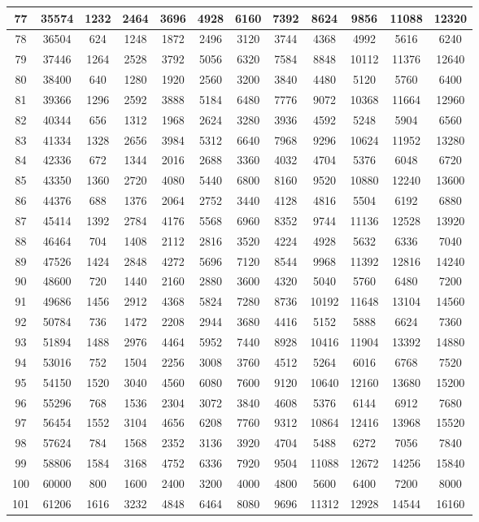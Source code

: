 \begin{center}
\begin{longtable}{|c|c|c|c|c|c|c|c|c|c|c|c|}
\hline
77 & 35574 & 1232 & 2464 & 3696 & 4928 & 6160 & 7392 & 8624 & 9856 & 11088 & 12320\tabularnewline
\hline
78 & 36504 & 624 & 1248 & 1872 & 2496 & 3120 & 3744 & 4368 & 4992 & 5616 & 6240\tabularnewline
\hline
79 & 37446 & 1264 & 2528 & 3792 & 5056 & 6320 & 7584 & 8848 & 10112 & 11376 & 12640\tabularnewline
\hline
80 & 38400 & 640 & 1280 & 1920 & 2560 & 3200 & 3840 & 4480 & 5120 & 5760 & 6400\tabularnewline
\hline
81 & 39366 & 1296 & 2592 & 3888 & 5184 & 6480 & 7776 & 9072 & 10368 & 11664 & 12960\tabularnewline
\hline
82 & 40344 & 656 & 1312 & 1968 & 2624 & 3280 & 3936 & 4592 & 5248 & 5904 & 6560\tabularnewline
\hline
83 & 41334 & 1328 & 2656 & 3984 & 5312 & 6640 & 7968 & 9296 & 10624 & 11952 & 13280\tabularnewline
\hline
84 & 42336 & 672 & 1344 & 2016 & 2688 & 3360 & 4032 & 4704 & 5376 & 6048 & 6720\tabularnewline
\hline
85 & 43350 & 1360 & 2720 & 4080 & 5440 & 6800 & 8160 & 9520 & 10880 & 12240 & 13600\tabularnewline
\hline
86 & 44376 & 688 & 1376 & 2064 & 2752 & 3440 & 4128 & 4816 & 5504 & 6192 & 6880\tabularnewline
\hline
87 & 45414 & 1392 & 2784 & 4176 & 5568 & 6960 & 8352 & 9744 & 11136 & 12528 & 13920\tabularnewline
\hline
88 & 46464 & 704 & 1408 & 2112 & 2816 & 3520 & 4224 & 4928 & 5632 & 6336 & 7040\tabularnewline
\hline
89 & 47526 & 1424 & 2848 & 4272 & 5696 & 7120 & 8544 & 9968 & 11392 & 12816 & 14240\tabularnewline
\hline
90 & 48600 & 720 & 1440 & 2160 & 2880 & 3600 & 4320 & 5040 & 5760 & 6480 & 7200\tabularnewline
\hline
91 & 49686 & 1456 & 2912 & 4368 & 5824 & 7280 & 8736 & 10192 & 11648 & 13104 & 14560\tabularnewline
\hline
92 & 50784 & 736 & 1472 & 2208 & 2944 & 3680 & 4416 & 5152 & 5888 & 6624 & 7360\tabularnewline
\hline
93 & 51894 & 1488 & 2976 & 4464 & 5952 & 7440 & 8928 & 10416 & 11904 & 13392 & 14880\tabularnewline
\hline
94 & 53016 & 752 & 1504 & 2256 & 3008 & 3760 & 4512 & 5264 & 6016 & 6768 & 7520\tabularnewline
\hline
95 & 54150 & 1520 & 3040 & 4560 & 6080 & 7600 & 9120 & 10640 & 12160 & 13680 & 15200\tabularnewline
\hline
96 & 55296 & 768 & 1536 & 2304 & 3072 & 3840 & 4608 & 5376 & 6144 & 6912 & 7680\tabularnewline
\hline
97 & 56454 & 1552 & 3104 & 4656 & 6208 & 7760 & 9312 & 10864 & 12416 & 13968 & 15520\tabularnewline
\hline
98 & 57624 & 784 & 1568 & 2352 & 3136 & 3920 & 4704 & 5488 & 6272 & 7056 & 7840\tabularnewline
\hline
99 & 58806 & 1584 & 3168 & 4752 & 6336 & 7920 & 9504 & 11088 & 12672 & 14256 & 15840\tabularnewline
\hline
100 & 60000 & 800 & 1600 & 2400 & 3200 & 4000 & 4800 & 5600 & 6400 & 7200 & 8000\tabularnewline
\hline
101 & 61206 & 1616 & 3232 & 4848 & 6464 & 8080 & 9696 & 11312 & 12928 & 14544 & 16160\tabularnewline

\end{longtable}
\end{center}
